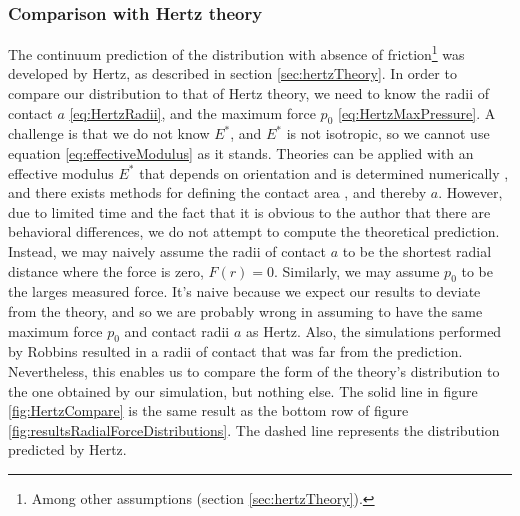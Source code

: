 \documentclass[twoside,english]{uiofysmaster}
\begin{document}
\subsubsection*{Comparison with Hertz theory}
The continuum prediction of the distribution with absence of friction\footnote{Among other assumptions (section \ref{sec:hertzTheory}).} was developed by Hertz, as described in section \ref{sec:hertzTheory}. 
In order to compare our distribution to that of Hertz theory, we need to know the radii of contact $a$ \eqref{eq:HertzRadii}, and the maximum force $p_0$ \eqref{eq:HertzMaxPressure}.
A challenge is that we do not know $E^*$, and $E^*$ is not isotropic, so we cannot use equation \eqref{eq:effectiveModulus} as it stands. 
Theories can be applied with an effective modulus $E^*$ that depends on orientation and is determined numerically \cite{Johnson1985},
and there exists methods for defining the contact area \cite{RobbinsDefiningContactAtTheAtomicScale}, and thereby $a$.  
However, due to limited time and the fact that it is obvious to the author that there are behavioral differences, we do not attempt to compute the theoretical prediction.
Instead, we may naively assume the radii of contact $a$ to be the shortest radial distance where the force is zero, $F(r)=0$. Similarly, we may assume $p_0$ to be the larges measured force.
It's naive because we expect our results to deviate from the theory, and so we are probably wrong in assuming  %
to have the same maximum force $p_0$ and contact radii $a$ as Hertz. Also, the simulations performed by Robbins resulted in a radii of contact that was far from the prediction. 
Nevertheless, this enables us to compare the form of the theory's distribution to the one obtained by our simulation, but nothing else.
The solid line in figure \ref{fig:HertzCompare} is the same result as the bottom row of figure \ref{fig:resultsRadialForceDistributions}.
The dashed line represents the distribution predicted by Hertz.
\end{document}
